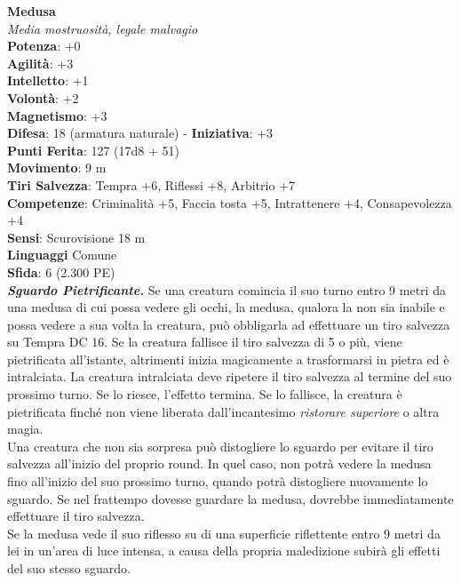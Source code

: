 \begin{multicols}{2}
\medskip\textbf{Medusa}\\
\emph{Media mostruosità, legale malvagio}\\
\textbf{Potenza}: +0\\
\textbf{Agilità}: +3\\
\textbf{Intelletto}: +1\\
\textbf{Volontà}: +2\\
\textbf{Magnetismo}: +3\\
\textbf{Difesa}: 18 (armatura naturale) - \textbf{Iniziativa}: +3\\
\textbf{Punti Ferita}: 127 (17d8 + 51)\\
\textbf{Movimento}: 9 m\\
\textbf{Tiri Salvezza}: Tempra +6, Riflessi +8, Arbitrio +7\\
\textbf{Competenze}: Criminalità +5, Faccia tosta +5, Intrattenere +4, Consapevolezza +4\\
\textbf{Sensi}: Scurovisione 18 m\\
\textbf{Linguaggi} Comune\\
\textbf{Sfida}: 6 (2.300 PE)\smallskip\\
\emph{\textbf{Sguardo Pietrificante.}} Se una creatura comincia il suo turno entro 9 metri da una medusa di cui possa vedere gli occhi, la medusa, qualora la non sia inabile e possa vedere a sua volta la creatura, può obbligarla ad effettuare un tiro salvezza su Tempra DC  16. Se la creatura fallisce il tiro salvezza di 5 o più, viene pietrificata all'istante, altrimenti inizia magicamente a trasformarsi in pietra ed è intralciata. La creatura intralciata deve ripetere il tiro salvezza al termine del suo prossimo turno. Se lo riesce, l'effetto termina. Se lo fallisce, la creatura è pietrificata finché non viene liberata dall'incantesimo \emph{ristorare superiore} o altra magia.\\
Una creatura che non sia sorpresa può distogliere lo sguardo per evitare il tiro salvezza all'inizio del proprio round. In quel caso, non potrà vedere la medusa fino all'inizio del suo prossimo turno, quando potrà distogliere nuovamente lo sguardo. Se nel frattempo dovesse guardare la medusa, dovrebbe immediatamente effettuare il tiro salvezza.\\
Se la medusa vede il suo riflesso su di una superficie riflettente entro 9 metri da lei in un'area di luce intensa, a causa della propria maledizione subirà gli effetti del suo stesso sguardo.\\


\end{multicols}

